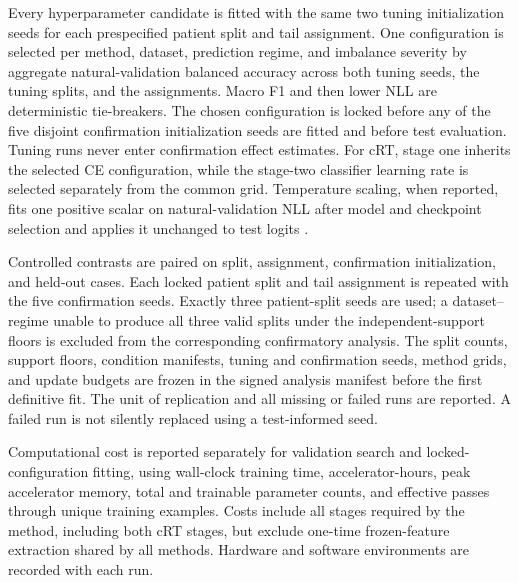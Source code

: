 \documentclass[11pt]{article}
\begin{document}
Every hyperparameter candidate is fitted with the same two tuning initialization seeds for each prespecified patient split and tail assignment. One configuration is selected per method, dataset, prediction regime, and imbalance severity by aggregate natural-validation balanced accuracy across both tuning seeds, the tuning splits, and the assignments. Macro F1 and then lower NLL are deterministic tie-breakers. The chosen configuration is locked before any of the five disjoint confirmation initialization seeds are fitted and before test evaluation. Tuning runs never enter confirmation effect estimates. For cRT, stage one inherits the selected CE configuration, while the stage-two classifier learning rate is selected separately from the common grid. Temperature scaling, when reported, fits one positive scalar on natural-validation NLL after model and checkpoint selection and applies it unchanged to test logits \citep{guo2017calibration}.

Controlled contrasts are paired on split, assignment, confirmation initialization, and held-out cases. Each locked patient split and tail assignment is repeated with the five confirmation seeds. Exactly three patient-split seeds are used; a dataset--regime unable to produce all three valid splits under the independent-support floors is excluded from the corresponding confirmatory analysis. The split counts, support floors, condition manifests, tuning and confirmation seeds, method grids, and update budgets are frozen in the signed analysis manifest before the first definitive fit. The unit of replication and all missing or failed runs are reported. A failed run is not silently replaced using a test-informed seed.

Computational cost is reported separately for validation search and locked-configuration fitting, using wall-clock training time, accelerator-hours, peak accelerator memory, total and trainable parameter counts, and effective passes through unique training examples. Costs include all stages required by the method, including both cRT stages, but exclude one-time frozen-feature extraction shared by all methods. Hardware and software environments are recorded with each run.
\end{document}
